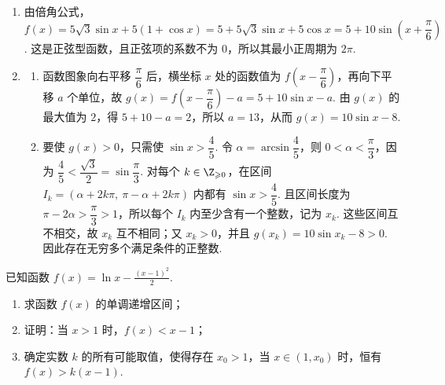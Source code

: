 \begin{solution}
\begin{enumerate}
\item 由倍角公式，
\(f(x)=5\sqrt3\sin x+5(1+\cos x)=5+5\sqrt3\sin x+5\cos x=5+10\sin\left(x+\dfrac\pi6\right)\).
这是正弦型函数，且正弦项的系数不为 \(0\)，所以其最小正周期为 \(2\pi\).
\item
\begin{enumerate}
\item 函数图象向右平移 \(\dfrac\pi6\) 后，横坐标 \(x\) 处的函数值为 \(f\left(x-\dfrac\pi6\right)\)，再向下平移 \(a\) 个单位，故
\(g(x)=f\left(x-\dfrac\pi6\right)-a=5+10\sin x-a\).
由 \(g(x)\) 的最大值为 \(2\)，得 \(5+10-a=2\)，所以 \(a=13\)，从而 \(g(x)=10\sin x-8\).
\item 要使 \(g(x)>0\)，只需使 \(\sin x>\dfrac45\). 令 \(\alpha=\arcsin\dfrac45\)，则 \(0<\alpha<\dfrac\pi3\)，因为 \(\dfrac45<\dfrac{\sqrt3}{2}=\sin\dfrac\pi3\).
对每个 \(k\in\Z_{\geqslant0}\)，在区间
\(I_k=\left(\alpha+2k\pi,\ \pi-\alpha+2k\pi\right)\)
内都有 \(\sin x>\dfrac45\). 且区间长度为 \(\pi-2\alpha>\dfrac\pi3>1\)，所以每个 \(I_k\) 内至少含有一个整数，记为 \(x_k\). 这些区间互不相交，故 \(x_k\) 互不相同；又 \(x_k>0\)，并且 \(g(x_k)=10\sin x_k-8>0\). 因此存在无穷多个满足条件的正整数.
\end{enumerate}
\end{enumerate}
\end{solution}

\begin{problem}
已知函数 \( f(x) = \ln x - \frac{(x - 1)^2}{2} \).

\begin{enumerate}
\item 求函数 \( f(x) \) 的单调递增区间；
\item 证明：当 \(x > 1\) 时，\(f(x) < x - 1\)；
\item 确定实数 \(k\) 的所有可能取值，使得存在 \(x_0 > 1\)，当 \(x \in (1, x_0)\) 时，恒有 \(f(x) > k (x - 1)\).
\end{enumerate}
\end{problem}

